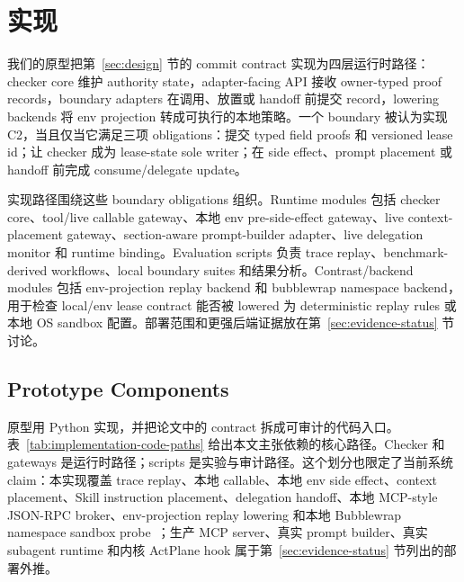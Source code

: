 \documentclass[UTF8,a4paper,11pt]{ctexart}
\begin{document}
\section{实现}
\label{sec:implementation}

我们的原型把第~\ref{sec:design} 节的 commit contract 实现为四层运行时路径：checker core 维护 authority state，adapter-facing API 接收 owner-typed proof records，boundary adapters 在调用、放置或 handoff 前提交 record，lowering backends 将 env projection 转成可执行的本地策略。一个 boundary 被认为实现 C2，当且仅当它满足三项 obligations：提交 typed field proofs 和 versioned lease id；让 checker 成为 lease-state sole writer；在 side effect、prompt placement 或 handoff 前完成 consume/delegate update。

实现路径围绕这些 boundary obligations 组织。Runtime modules 包括 checker core、tool/live callable gateway、本地 env pre-side-effect gateway、live context-placement gateway、section-aware prompt-builder adapter、live delegation monitor 和 runtime binding。Evaluation scripts 负责 trace replay、benchmark-derived workflows、local boundary suites 和结果分析。Contrast/backend modules 包括 env-projection replay backend 和 bubblewrap namespace backend，用于检查 local/env lease contract 能否被 lowered 为 deterministic replay rules 或本地 OS sandbox 配置。部署范围和更强后端证据放在第~\ref{sec:evidence-status} 节讨论。

\subsection{Prototype Components}

原型用 Python 实现，并把论文中的 contract 拆成可审计的代码入口。表~\ref{tab:implementation-code-paths} 给出本文主张依赖的核心路径。Checker 和 gateways 是运行时路径；scripts 是实验与审计路径。这个划分也限定了当前系统 claim：本实现覆盖 trace replay、本地 callable、本地 env side effect、context placement、Skill instruction placement、delegation handoff、本地 MCP-style JSON-RPC broker、env-projection replay lowering 和本地 Bubblewrap namespace sandbox probe~\cite{bubblewrap}；生产 MCP server、真实 prompt builder、真实 subagent runtime 和内核 ActPlane hook 属于第~\ref{sec:evidence-status} 节列出的部署外推。
\end{document}
